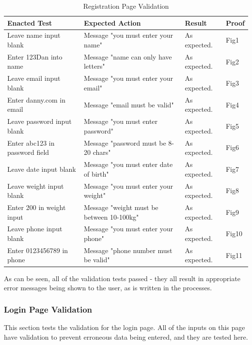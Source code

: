 \documentclass{article}[12pt,a4paper]
\begin{document}
\begin{table}[h]
\begin{tabular}{|l|l|l|l|}
\hline
\textbf{Enacted Test}          & \textbf{Expected Action}                  & \textbf{Result} & \textbf{Proof} \\ \hline
Leave name input blank         & Message "you must enter your name"        & As expected.    & Fig1           \\ \hline
Enter 123Dan into name         & Message "name can only have letters"      & As expected.    & Fig2           \\ \hline
Leave email input blank        & Message "you must enter your email"       & As expected.    & Fig3           \\ \hline
Enter danny.com in email       & Message "email must be valid"             & As expected.    & Fig4           \\ \hline
Leave password input blank     & Message "you must enter password"         & As expected.    & Fig5           \\ \hline
Enter abc123 in password field & Message "password must be 8-20 chars"     & As expected.    & Fig6           \\ \hline
Leave date input blank         & Message "you must enter date of birth"    & As expected.    & Fig7           \\ \hline
Leave weight input blank       & Message "you must enter your weight"      & As expected.    & Fig8           \\ \hline
Enter 200 in weight input      & Message "weight must be between 10-100kg" & As expected.    & Fig9           \\ \hline
Leave phone input blank        & Message "you must enter your phone"       & As expected.    & Fig10          \\ \hline
Enter 0123456789 in phone      & Message "phone number must be valid"      & As expected.    & Fig11          \\ \hline
\end{tabular}
\caption{Registration Page Validation}
\end{table}

As can be seen, all of the validation tests passed - they all result in appropriate error messages being shown to the user, as is written in the processes.

\clearpage

\subsubsection{Login Page Validation}
This section tests the validation for the login page. All of the inputs on this page have validation to prevent erroneous data being entered, and they are tested here.
\end{document}
